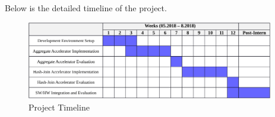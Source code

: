 \documentclass{article}
\begin{document}
Below is the detailed timeline of the project.

\begin{figure}[h]
    \centering
    \includegraphics[width=0.96\textwidth]{figures/milestone-crop.pdf}
    \caption{Project Timeline}
    \label{fig:milestone}
    \vspace{-10pt}
\end{figure}
\end{document}
